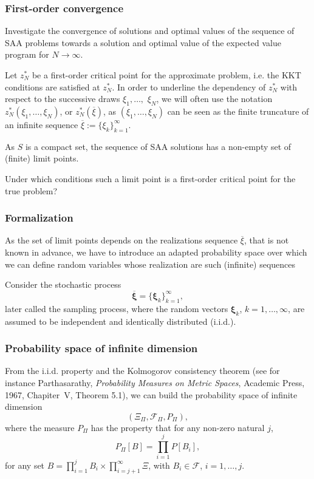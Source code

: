 \documentclass{beamer}
\def\bxi{\boldsymbol\xi}
\begin{document}
\begin{frame}
\frametitle{First-order convergence}

Investigate the convergence of solutions and optimal values of the sequence of SAA problems towards a solution and optimal value of the expected value program for $N \rightarrow \infty$.

\mbox{}

Let {\red $z_N^*$ be a first-order critical point} for the approximate problem, i.e. the KKT conditions are satisfied at $z_N^*$.
In order to underline the dependency of $z_N^*$ with respect to the successive draws  $\xi_1,\ldots,$ $\xi_N$, we will often use the notation $z_N^*(\xi_1,\ldots,\xi_N)$, or $z_N^*\left(\overline{\xi}\right)$, as $(\xi_1,\ldots,\xi_N)$ can be seen as the finite truncature of an infinite sequence $\overline{\xi} := \lbrace \xi_k \rbrace_{k =   1}^{\infty}$.

\mbox{}

As $S$ is a compact set, the sequence of SAA solutions has a non-empty set of (finite) limit points.

\mbox{}

{\blue Under which conditions such a limit point is a first-order critical point for the true problem?}

\end{frame}

\begin{frame}
\frametitle{Formalization}

As the set of limit points depends on the realizations sequence $\overline{\xi}$, that is not known in advance, we have to introduce an adapted probability space over which we can define random variables whose realization are such (infinite) sequences

\mbox{}

Consider the stochastic process
\[
\overline{\bxi} = \lbrace \bxi_k \rbrace_{k = 1}^{\infty},
\]
later called the sampling process, where the random vectors $\bxi_k$, $k = 1,\ldots, \infty$, are assumed to be independent and identically distributed (i.i.d.).

\end{frame}

\begin{frame}
\frametitle{Probability space of infinite dimension}

From the i.i.d. property and the Kolmogorov consistency theorem (see for instance Parthasarathy, {\sl Probability Measures on Metric   Spaces}, Academic Press, 1967, Chapiter~V, Theorem 5.1), we can build the probability space of infinite dimension
\[
\left( \Xi_{\Pi}, \mathcal{F}_{\Pi}, P_{\Pi} \right),
\]
where the measure $P_{\Pi}$ has the property that for any non-zero natural $j$,
\[
P_{\Pi}[B] = \prod_{i = 1}^j P[B_i],
\]
for any set $B = \prod_{i=1}^j B_i \times \prod_{i=j+1}^{\infty} \Xi$, with $B_i \in \mathcal{F}$, $i =
1,\ldots,j$.

\end{frame}
\end{document}
